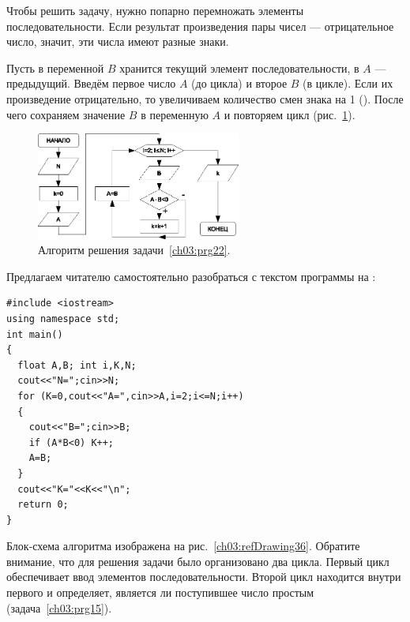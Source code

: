 
Чтобы решить задачу, нужно попарно перемножать элементы последовательности. Если результат произведения пары чисел ---
отрицательное число, значит, эти числа имеют разные знаки. 

Пусть в переменной $B$ хранится текущий элемент последовательности, в $A$ --- предыдущий. Введём первое 
число $A$ (до цикла) и
второе $B$ (в цикле). Если их произведение отрицательно, то увеличиваем количество смен знака на 1 (). После чего
сохраняем значение $B$ в переменную $A$ и повторяем цикл (рис.~\ref{ch03:refDrawing35}).

\begin{figure}[htb]
\begin{center}
\includegraphics[width=0.6\textwidth]{img/ris_3_36}
\caption{Алгоритм решения задачи~\ref{ch03:prg22}.}
\label{ch03:refDrawing35}
\end{center}
\end{figure}

Предлагаем читателю самостоятельно разобраться с текстом программы на : 
\begin{lstlisting}
#include <iostream>
using namespace std;
int main()
{
  float A,B; int i,K,N;
  cout<<"N=";cin>>N;
  for (K=0,cout<<"A=",cin>>A,i=2;i<=N;i++)
  {
    cout<<"B=";cin>>B;
    if (A*B<0) K++;
    A=B;
  }
  cout<<"K="<<K<<"\n";
  return 0;
}
\end{lstlisting}



Блок-схема алгоритма изображена на рис.~\ref{ch03:refDrawing36}. Обратите внимание, что для решения задачи было организовано два
цикла. Первый цикл обеспечивает ввод элементов последовательности. Второй цикл находится внутри первого и определяет,
является ли поступившее число простым (задача~\ref{ch03:prg15}).


